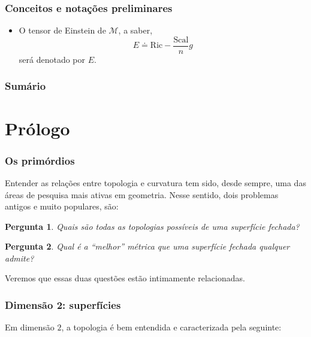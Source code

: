 \documentclass{beamer}
\newcommand{\Ric}{\mathrm{Ric}}
\newcommand{\Scal}{\mathrm{Scal}}
\newcommand{\mm}{\mathcal{M}}
\newtheorem{perg}{Pergunta}
\newcommand{\quotes}[1]{``#1''}
\begin{document}
\begin{frame}
\frametitle{Conceitos e notações preliminares}
\begin{itemize}
\item O tensor de Einstein de $\mm$, a saber,
\[
E \doteq \Ric - \frac{\Scal}{n} g
\] será denotado por $E$.
\end{itemize}
\end{frame}

\begin{frame}
\frametitle{Sumário} %
\tableofcontents %
\end{frame}


\section{Prólogo}
\begin{frame}
\frametitle{Os primórdios}
Entender as relações entre topologia e curvatura tem sido, desde sempre, uma das áreas de pesquisa mais ativas em geometria. Nesse sentido, dois problemas antigos e muito populares, são:
\begin{perg}
Quais são todas as topologias possíveis de uma superfície fechada?
\end{perg}
\begin{perg}
Qual é a \quotes{melhor} métrica que uma superfície fechada qualquer admite?
\end{perg}
\pause
Veremos que essas duas questões estão intimamente relacionadas. 
\end{frame}
\begin{frame}
\frametitle{Dimensão 2: superfícies}
Em dimensão $2$, a topologia é bem entendida e caracterizada pela seguinte:
\end{frame}
\end{document}
